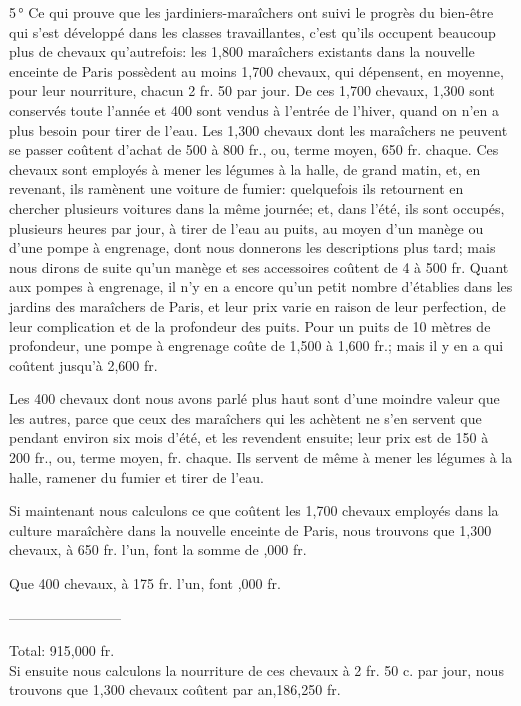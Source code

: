 \documentclass[10pt,a4paper]{book}
\begin{document}
5\,° Ce qui prouve que les jardiniers-maraîchers ont suivi le progrès du bien-être qui s'est développé dans les classes travaillantes, c'est qu'ils occupent beaucoup plus de chevaux qu'autrefois: les 1,800 maraîchers existants dans la nouvelle enceinte de Paris possèdent au moins 1,700 chevaux, qui dépensent, en moyenne, pour leur nourriture, chacun 2 fr. 50 par jour. De ces 1,700 chevaux, 1,300 sont conservés toute l'année et 400 sont vendus à l'entrée de l'hiver, quand on n'en a plus besoin pour tirer de l'eau. Les 1,300 chevaux dont les maraîchers ne peuvent se passer coûtent d'achat de 500 à 800 fr., ou, terme moyen, 650 fr. chaque. Ces chevaux sont employés à mener les légumes à la halle, de grand matin, et, en revenant, ils ramènent une voiture de fumier: quelquefois ils retournent en chercher plusieurs voitures dans la même journée; et, dans l'été, ils sont occupés, plusieurs heures par jour, à tirer de l'eau au puits, au moyen d'un manège ou d'une pompe à engrenage, dont nous donnerons les descriptions plus tard; mais nous dirons de suite qu'un manège et ses accessoires coûtent de 4 à 500 fr. Quant aux pompes à engrenage, il n'y en a encore qu'un petit nombre d'établies dans les jardins des maraîchers de Paris, et leur prix varie en raison de leur perfection, de leur complication et de la profondeur des puits. Pour un puits de 10 mètres de profondeur, une pompe à engrenage coûte de 1,500 à 1,600 fr.; mais il y en a qui coûtent jusqu'à 2,600 fr.

Les 400 chevaux dont nous avons parlé plus haut sont d'une moindre valeur que les autres, parce que ceux des maraîchers qui les achètent ne s'en servent que pendant environ six mois d'été, et les revendent ensuite; leur prix est de 150 à 200 fr., ou, terme moyen, fr. chaque. Ils servent de même à mener les légumes à la halle, ramener du fumier et tirer de l'eau.

Si maintenant nous calculons ce que coûtent les 1,700 chevaux employés dans la culture maraîchère dans la nouvelle enceinte de Paris, nous trouvons que 1,300 chevaux, à 650 fr. l'un, font la somme de ,000 fr.

Que 400 chevaux, à 175 fr. l'un, font ,000 fr.

\hfill ------------------------

\hfill Total: 915,000 fr.\\

Si ensuite nous calculons la nourriture de ces chevaux à 2 fr. 50 c. par jour, nous trouvons que 1,300 chevaux coûtent par an,186,250 fr.
\end{document}
